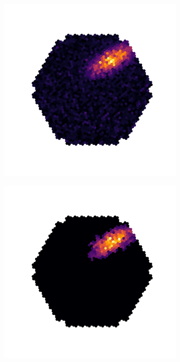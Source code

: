 \begin{figure}
	\centering
	\begin{subfigure}{.4\textwidth}
  		\centering
  		\includegraphics[width=\linewidth]{Plots/hillas_raw.pdf}
	\end{subfigure}%
	\begin{subfigure}{.4\textwidth}
 		\centering
		\includegraphics[width=\linewidth]{Plots/hillas_cleaned.pdf}

\end{subfigure}
\end{figure}
